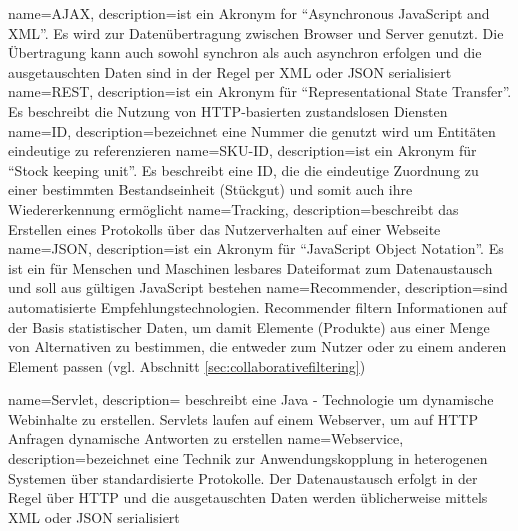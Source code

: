 
{
  name=AJAX,
  description={ist ein Akronym for ``Asynchronous JavaScript and XML''. Es wird zur Datenübertragung zwischen Browser und Server genutzt. Die Übertragung kann auch sowohl synchron als auch asynchron erfolgen und die ausgetauschten Daten sind in der Regel per XML oder JSON serialisiert}
}
{
  name=REST,
  description={ist ein Akronym für ``Representational State Transfer''. Es beschreibt die Nutzung von HTTP-basierten zustandslosen Diensten}
}
{
  name=ID,
  description={bezeichnet eine Nummer die genutzt wird um Entitäten eindeutige zu referenzieren}
}
{
  name=SKU-ID,
  description={ist ein Akronym für ``Stock keeping unit''. Es beschreibt eine ID, die die eindeutige Zuordnung zu einer bestimmten Bestandseinheit (Stückgut) und somit auch ihre Wiedererkennung ermöglicht}
}
{
  name=Tracking,
  description={beschreibt das Erstellen eines Protokolls über das Nutzerverhalten auf einer Webseite}
}
{
  name=JSON,
  description={ist ein Akronym für ``JavaScript Object Notation''. Es ist ein für Menschen und Maschinen lesbares Dateiformat zum Datenaustausch und soll aus gültigen JavaScript bestehen}
}
{
  name=Recommender,
  description={sind automatisierte Empfehlungstechnologien. Recommender filtern Informationen auf der Basis statistischer Daten, um damit Elemente (Produkte) aus einer Menge von Alternativen zu bestimmen, die entweder zum Nutzer oder zu einem anderen Element passen (vgl. Abschnitt \ref{sec:collaborativefiltering})}
}

{
  name=Servlet,
  description={ beschreibt eine Java - Technologie um dynamische Webinhalte zu erstellen. Servlets laufen auf einem Webserver, um auf HTTP Anfragen dynamische Antworten zu erstellen}
}
{
  name=Webservice,
  description={bezeichnet eine Technik zur Anwendungskopplung in heterogenen Systemen über standardisierte Protokolle. Der Datenaustausch erfolgt in der Regel über HTTP und die ausgetauschten Daten werden üblicherweise mittels XML oder JSON serialisiert}
}
\newpage\printglossary[title=Glossar,toctitle=Glossar] 


\glsaddall
